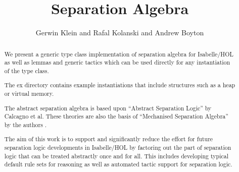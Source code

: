 \documentclass[11pt,a4paper]{article}
\begin{document}
\title{Separation Algebra}
\author{Gerwin Klein and Rafal Kolanski and Andrew Boyton}
\maketitle

\begin{abstract}
We present a generic type class implementation of separation
algebra for Isabelle/HOL as well as lemmas and generic tactics which can
be used directly for any instantiation of the type class.

The ex directory contains example instantiations that include structures
such as a heap or virtual memory.

The abstract separation algebra is based upon ``Abstract Separation
Logic'' by Calcagno et al. These theories are also the basis of
``Mechanised Separation Algebra'' by the authors \cite{KleinKB-ITP12}.

The aim of this work is to support and significantly reduce the effort
for future separation logic developments in Isabelle/HOL by factoring
out the part of separation logic that can be treated abstractly once
and for all. This includes developing typical default rule sets for
reasoning as well as automated tactic support for separation logic.
\end{abstract}

\tableofcontents





\end{document}

